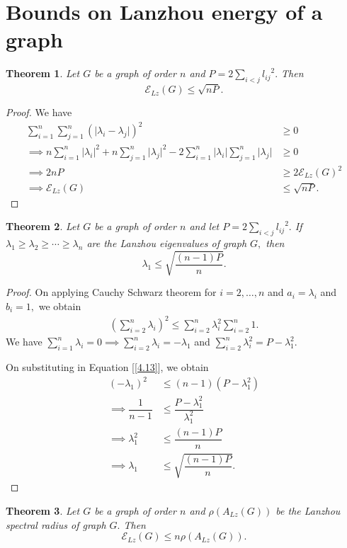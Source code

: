 \documentclass[10pt,a4paper,oneside]{article}
\newtheorem{theorem}{Theorem}
\begin{document}
\section{Bounds on Lanzhou energy of a graph}\label{4.12}
\begin{theorem}
Let $G$ be a graph of order $n$ and $P=2\sum\limits_{i< j}{l_{ij}}^2.$ Then
$$\mathcal{E}_{Lz}(G)\leq \sqrt{nP}.$$
\end{theorem}
\begin{proof}
We have 
\begin{align*}
\sum\limits_{i=1}^{n}\sum\limits_{j=1}^{n}(\vert \lambda_i-\lambda_j\vert)^2&\geq 0\\\implies n\sum\limits_{i=1}^{n}\vert \lambda_i\vert^2+n	\sum\limits_{j=1}^{n}\vert \lambda_j\vert ^2-2\sum\limits_{i=1}^{n}\vert \lambda_i\vert \sum\limits_{j=1}^{n}\vert \lambda_j\vert &\geq 0\\\implies 2nP&\geq 2\mathcal{E}_{Lz}(G)^2\\\implies \mathcal{E}_{Lz}(G)&\leq \sqrt{nP}.
\end{align*}
\end{proof}
\begin{theorem}
Let $G$ be a graph of order $n$ and let $P=2\sum\limits_{i< j}{l_{ij}}^2.$ If $\lambda_1\geq \lambda_2\geq \cdots\geq \lambda_n$ are the Lanzhou eigenvalues of graph $G,$ then
$$\lambda_1\leq \sqrt{\dfrac{(n-1)P}{n}}.$$
\end{theorem}
\begin{proof}
On applying Cauchy Schwarz theorem for $i=2,\ldots,n$ and $a_i=\lambda_i$ and $b_i=1,$ we obtain 
\begin{align}\label{4.13}
\left(\sum\limits_{i=2}^{n}\lambda_i\right)^2\leq \sum\limits_{i=2}^{n}\lambda_i^2\sum\limits_{i=2}^{n}1.
\end{align}
We have $\sum\limits_{i=1}^{n}\lambda_i=0\implies\sum\limits_{i=2}^{n}\lambda_i=-\lambda_1$ and $\sum\limits_{i=2}^{n}\lambda_i^2=P-\lambda_1^2.$
	
On substituting in Equation [\ref{4.13}], we obtain
\begin{align*}
(-\lambda_1)^2&\leq (n-1)(P-\lambda_1^2)\\\implies \dfrac{1}{n-1}&\leq \dfrac{P-\lambda_1^2}{\lambda_1^2}\\\implies  \lambda_1^2&\leq \dfrac{(n-1)P}{n}\\\implies \lambda_1&\leq \sqrt{\dfrac{(n-1)P}{n}}.
\end{align*}
\end{proof}
\begin{theorem}
Let $G$ be a graph of order $n$ and $\rho(A_{Lz}(G))$ be the Lanzhou spectral radius of graph $G.$ Then
$$\mathcal{E}_{Lz}(G)\leq n\rho(A_{Lz}(G)).$$
\end{theorem}
\end{document}

